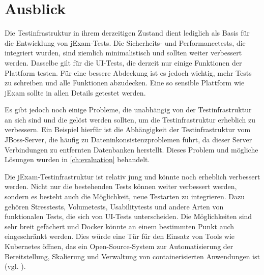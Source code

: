 \section{Ausblick}

Die Testinfrastruktur in ihrem derzeitigen Zustand dient lediglich als
Basis für die Entwicklung von jExam-Tests. Die Sicherheits- und
Performancetests, die integriert wurden, sind ziemlich minimalistisch
und sollten weiter verbessert werden. Dasselbe gilt für die UI-Tests,
die derzeit nur einige Funktionen der Plattform testen. Für eine bessere
Abdeckung ist es jedoch wichtig, mehr Tests zu schreiben und alle Funktionen
abzudecken. Eine so sensible Plattform wie jExam sollte in allen Details
getestet werden.

Es gibt jedoch noch einige Probleme, die unabhängig von der Testinfrastruktur
an sich sind und die  gelöst werden sollten, um die Testinfrastruktur erheblich
zu verbessern. Ein Beispiel hierfür ist die Abhängigkeit der Testinfrastruktur
vom JBoss-Server, die häufig zu Dateninkonsistenzproblemen führt, da dieser
Server Verbindungen zu entfernten Datenbanken herstellt. Dieses Problem und
mögliche Lösungen wurden in \autoref{ch:evaluation} behandelt.

Die jExam-Testinfrastruktur ist relativ jung und könnte noch erheblich verbessert
werden. Nicht nur die bestehenden Tests können weiter verbessert werden, sondern
es besteht auch die Möglichkeit, neue Testarten zu integrieren. Dazu gehören
Stresstests, Volumetests, Usabilitytests und andere Arten von funktionalen
Tests, die sich von UI-Tests unterscheiden. Die Möglichkeiten sind sehr breit
gefächert und Docker könnte an einem bestimmten Punkt auch eingeschränkt werden.
Dies würde eine Tür für den Einsatz von Tools wie Kubernetes öffnen, das ein
Open-Source-System zur Automatisierung der Bereitstellung, Skalierung und
Verwaltung von containerisierten Anwendungen ist (vgl. \cite{kubernetes}).
